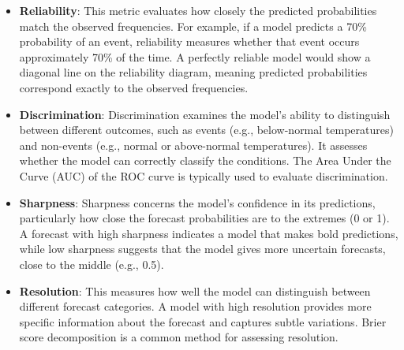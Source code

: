 \begin{itemize}
    \item \textbf{Reliability}: This metric evaluates how closely the predicted probabilities match the observed frequencies. For example, if a model predicts a 70\% probability of an event, reliability measures whether that event occurs approximately 70\% of the time. A perfectly reliable model would show a diagonal line on the reliability diagram, meaning predicted probabilities correspond exactly to the observed frequencies.
    
    \item \textbf{Discrimination}: Discrimination examines the model's ability to distinguish between different outcomes, such as events (e.g., below-normal temperatures) and non-events (e.g., normal or above-normal temperatures). It assesses whether the model can correctly classify the conditions. The Area Under the Curve (AUC) of the ROC curve is typically used to evaluate discrimination.
    
    \item \textbf{Sharpness}: Sharpness concerns the model’s confidence in its predictions, particularly how close the forecast probabilities are to the extremes (0 or 1). A forecast with high sharpness indicates a model that makes bold predictions, while low sharpness suggests that the model gives more uncertain forecasts, close to the middle (e.g., 0.5).
    
    \item \textbf{Resolution}: This measures how well the model can distinguish between different forecast categories. A model with high resolution provides more specific information about the forecast and captures subtle variations. Brier score decomposition is a common method for assessing resolution.
\end{itemize}


